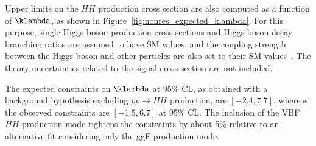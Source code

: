 \documentclass[PAPER, cernpreprint, texlive=2016, paper=a4, USenglish, texmf]{atlasdoc}
\begin{document}
Upper limits on the $HH$ production cross section are also computed as a function of $\klambda$, as shown in  Figure~\ref{fig:nonres_expected_klambda}. For this purpose, single-Higgs-boson production cross sections and Higgs boson decay branching ratios are assumed to have SM values, and the coupling strength between the Higgs boson and other particles are also set to their SM values~\cite{HIGG-2018-57}.
The theory uncertainties related to the signal cross section are not included.
 
The expected constraints on $\klambda$ at 95\% CL, as obtained with a background hypothesis excluding $pp \to HH$ production, are $[-2.4, 7.7]$, whereas the observed constraints are $[-1.5, 6.7]$  at 95\% CL.
The inclusion of the VBF $HH$ production mode tightens the constraints by about 5\% relative to an alternative fit considering only the ggF production mode.
 
 
 
\end{document}
